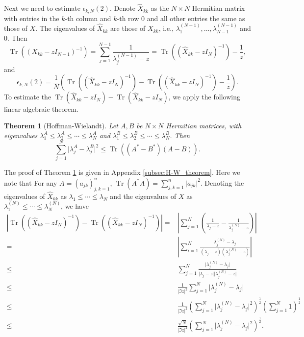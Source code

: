 \documentclass[11pt, a4paper]{article}
\numberwithin{equation}{section}
\newcommand{\ie}{i.e.}
\DeclareMathOperator{\Tr}{Tr}
\newtheorem{thm}{Theorem}
\theoremstyle{definition}
\theoremstyle{remark}
\begin{document}
Next we need to estimate $\epsilon_{k, N}(2)$. Denote $\hat{X}_{kk}$ as the $N \times N$ Hermitian matrix with entries in the $k$-th column and $k$-th row $0$ and all other entries the same as those of $X$. The eigenvalues of $\hat{X}_{kk}$ are those of $X_{kk}$, \ie, $\lambda^{(N - 1)}_1, \dotsc, \lambda^{(N - 1)}_{N - 1}$ and $0$. Then
\begin{equation}
  \Tr((X_{kk} - zI_{N - 1})^{-1}) = \sum^{N - 1}_{j = 1} \frac{1}{\lambda^{(N - 1)}_j - z} = \Tr((\hat{X}_{kk} - zI_N)^{-1}) - \frac{1}{z},
\end{equation}
and
\begin{equation}
  \epsilon_{k, N}(2) = \frac{1}{N} \left( \Tr((\hat{X}_{kk} - zI_N)^{-1}) - \Tr((\hat{X}_{kk} - zI_N)^{-1}) - \frac{1}{z} \right).
\end{equation}
To estimate the $\Tr(\hat{X}_{kk} - zI_N) - \Tr(\hat{X}_{kk} - zI_N)$, we apply the following linear algebraic theorem.
\begin{thm}[Hoffman-Wielandt] \label{thm:Hoffman-Wielandt_Hermitian}
  Let $A, B$ be $N \times N$ Hermitian matrices, with eigenvalues $\lambda^A_1 \leq \lambda^A_2 \leq \dotsb \leq \lambda^A_N$ and $\lambda^B_1 \leq \lambda^B_2 \leq \dotsb \leq \lambda^B_N$. Then
  \begin{equation}
    \sum^N_{j = 1} \lvert \lambda^A_j - \lambda^B_j \rvert^2 \leq \Tr((A^* - B^*)(A - B)).
  \end{equation}
\end{thm}
The proof of Theorem \ref{thm:Hoffman-Wielandt_Hermitian} is given in Appendix \ref{subsec:H-W_theorem}. Here we note that For any $A = (a_{jk})^n_{j, k = 1}$, $\Tr(A^* A) = \sum^n_{j, k = 1} \lvert a_{jk} \rvert^2$.
Denoting the eigenvalues of $\hat{X}_{kk}$ as $\lambda_1 \leq \dotsb \leq \lambda_N$ and the eigenvalues of $X$ as $\lambda^{(N)}_1 \leq \dotsb \leq \lambda^{(N)}_N$, we have
\begin{equation}
  \begin{split}
    \left\lvert \Tr((\hat{X}_{kk} - zI_N)^{-1}) - \Tr((\hat{X}_{kk} - zI_N)^{-1}) \right\rvert = {}& \left\lvert \sum^N_{j = 1} \left( \frac{1}{\lambda_j - z} - \frac{1}{\lambda^{(N)}_j - z} \right) \right\rvert \\
    = {}& \left\lvert \sum^N_{i = 1} \frac{\lambda^{(N)}_j - \lambda_j}{(\lambda_j - z)(\lambda^{(N)}_j - z)} \right\rvert \\
    \leq {}& \sum^N_{j = 1} \frac{\lvert \lambda^{(N)}_j - \lambda_j \rvert}{\lvert \lambda_j - z \rvert \lvert \lambda^{(N)}_j - z \rvert} \\
    \leq {}& \frac{1}{\lvert \Im z \rvert^2} \sum^N_{j = 1} \lvert \lambda^{(N)}_j - \lambda_j \rvert \\
    \leq {}& \frac{1}{\lvert \Im z \rvert^2} \left( \sum^N_{j = 1} \lvert \lambda^{(N)}_j - \lambda_j \rvert^2 \right)^{\frac{1}{2}} \left( \sum^N_{j = 1} 1 \right)^{\frac{1}{2}} \\
    \leq {}& \frac{\sqrt{N}}{\lvert \Im z \rvert^2} \left( \sum^N_{j = 1} \lvert \lambda^{(N)}_j - \lambda_j \rvert^2 \right)^{\frac{1}{2}}.
  \end{split}
\end{equation}
\end{document}
